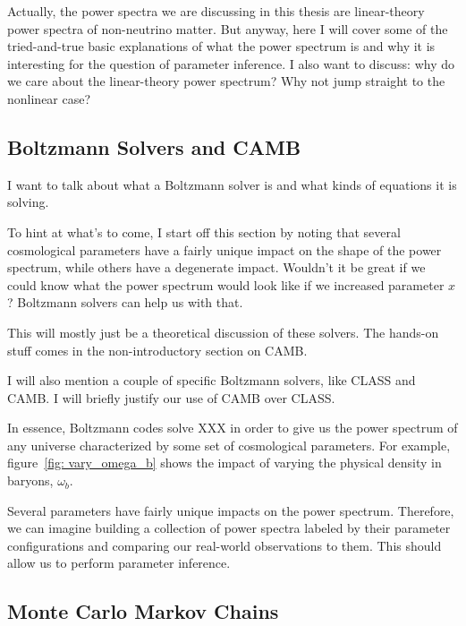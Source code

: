 \documentclass[11pt]{article}
\begin{document}
Actually, the power spectra we are discussing in this thesis are linear-theory power spectra of non-neutrino matter. But anyway, here I will cover some of the tried-and-true basic explanations of what the power spectrum is and why it is interesting for the question of parameter inference. I also want to discuss: why do we care about the linear-theory power spectrum? Why not jump straight to the nonlinear case?

\begin{centering}
\subsection{Boltzmann Solvers and CAMB}
\end{centering}

I want to talk about what a Boltzmann solver is and what kinds of equations it is solving.

To hint at what's to come, I start off this section by noting that several cosmological parameters have a fairly unique impact on the shape of the power spectrum, while others have a degenerate impact. Wouldn't it be great if we could know what the power spectrum would look like if we increased parameter $x$? Boltzmann solvers can help us with that.

This will mostly just be a theoretical discussion of these solvers. The hands-on stuff comes in the non-introductory section on CAMB.

I will also mention a couple of specific Boltzmann solvers, like CLASS and CAMB. I will briefly justify our use of CAMB over CLASS.


In essence, Boltzmann codes solve XXX in order to give us the power spectrum
of any universe characterized by some set of cosmological parameters. For
example, figure~\ref{fig: vary_omega_b} shows the impact of varying the
physical density in baryons, $\omega_b$. 

Several parameters have fairly unique impacts on the power spectrum.
Therefore, we can imagine building a collection of power spectra labeled by
their parameter configurations and comparing our real-world observations to
them. This should allow us to perform parameter inference.

\begin{centering}
\subsection{Monte Carlo Markov Chains}
\end{centering}
\end{document}
